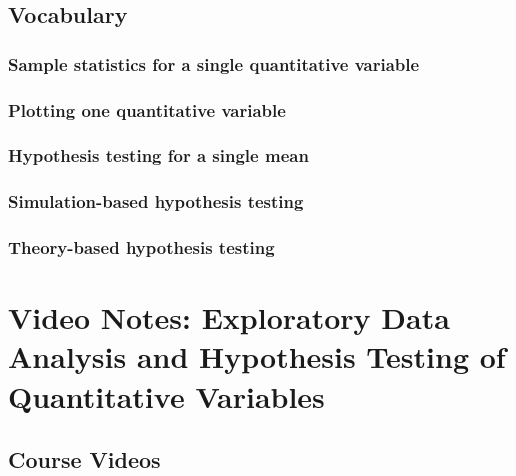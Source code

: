 \documentclass[
]{report}
\begin{document}
\subsection{Vocabulary}\label{vocabulary-4}

\subsubsection*{Sample statistics for a single quantitative variable}\label{sample-statistics-for-a-single-quantitative-variable}

\subsubsection*{Plotting one quantitative variable}\label{plotting-one-quantitative-variable}

\subsubsection*{Hypothesis testing for a single mean}\label{hypothesis-testing-for-a-single-mean}

\subsubsection*{Simulation-based hypothesis testing}\label{simulation-based-hypothesis-testing}

\subsubsection*{Theory-based hypothesis testing}\label{theory-based-hypothesis-testing}

\section{Video Notes: Exploratory Data Analysis and Hypothesis Testing of Quantitative Variables}\label{video-notes-exploratory-data-analysis-and-hypothesis-testing-of-quantitative-variables}

\subsection{Course Videos}\label{course-videos-4}
\end{document}
